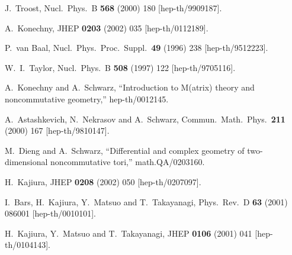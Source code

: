 \documentclass[a4paper,epsf,12pt]{article}
\begin{document}
\begin{thebibliography}{99}
J.~Troost,
Nucl.\ Phys.\ B {\bf 568} (2000) 180
[hep-th/9909187].

A.~Konechny,
JHEP {\bf 0203} (2002) 035
[hep-th/0112189].

P.~van Baal,
Nucl.\ Phys.\ Proc.\ Suppl.\  {\bf 49} (1996) 238
[hep-th/9512223].

W.~I.~Taylor,
Nucl.\ Phys.\ B {\bf 508} (1997) 122
[hep-th/9705116].

A.~Konechny and A.~Schwarz,
``Introduction to M(atrix) theory and noncommutative geometry,''
hep-th/0012145.

A.~Astashkevich, N.~Nekrasov and A.~Schwarz,
Commun.\ Math.\ Phys.\  {\bf 211} (2000) 167
[hep-th/9810147].

M.~Dieng and A.~Schwarz,
``Differential and complex geometry of two-dimensional noncommutative tori,''
math.QA/0203160.

H.~Kajiura,
JHEP {\bf 0208} (2002) 050
[hep-th/0207097].

I.~Bars, H.~Kajiura, Y.~Matsuo and T.~Takayanagi,
Phys.\ Rev.\ D {\bf 63} (2001) 086001
[hep-th/0010101].

H.~Kajiura, Y.~Matsuo and T.~Takayanagi,
JHEP {\bf 0106} (2001) 041
[hep-th/0104143].

\end{thebibliography}
\end{document}
